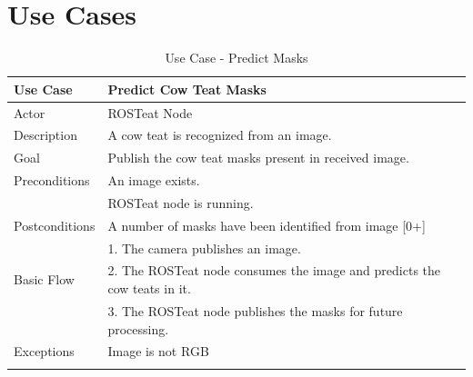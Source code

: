 \section{Use Cases}
\lipsum[2]
\begin{longtable}{@{} p{3.5cm} p{10.5cm} @{}} \toprule
\textbf{Use Case}       & \textbf{Predict Cow Teat Masks} \\ \midrule
Actor                   & ROSTeat Node \\ \cmidrule{1-2}
Description             & A cow teat is recognized from an image. \\ \cmidrule{1-2}
Goal                    & Publish the cow teat masks present in received image. \\ \cmidrule{1-2}
Preconditions           & An image exists. \\ 
                        & ROSTeat node is running. \\ \cmidrule{1-2} 
Postconditions          & A number of masks have been identified from image [0+]\\ \cmidrule{1-2} 
                        & 1. The camera publishes an image. \\ 
Basic Flow              & 2. The ROSTeat node consumes the image and predicts the cow teats in it. \\
                        & 3. The ROSTeat node publishes the masks for future processing. \\ \cmidrule{1-2}
Exceptions             & Image is not RGB \\ \bottomrule
\caption{Use Case - Predict Masks} \label{tab:tabcu-prop} \\
\end{longtable}

